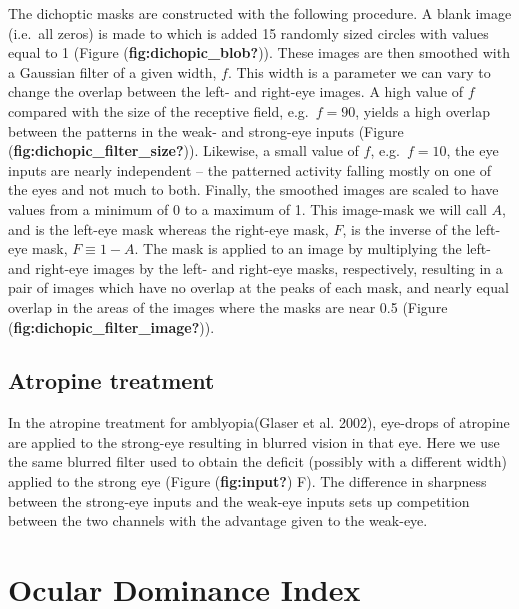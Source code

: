 \documentclass[
  letterpaper,
]{book}
\begin{document}
The dichoptic masks are constructed with the following procedure. A
blank image (i.e.~all zeros) is made to which is added 15 randomly sized
circles with values equal to 1 (Figure (\textbf{fig:dichopic\_blob?})).
These images are then smoothed with a Gaussian filter of a given width,
\(f\). This width is a parameter we can vary to change the overlap
between the left- and right-eye images. A high value of \(f\) compared
with the size of the receptive field, e.g.~\(f=90\), yields a high
overlap between the patterns in the weak- and strong-eye inputs (Figure
(\textbf{fig:dichopic\_filter\_size?})). Likewise, a small value of
\(f\), e.g.~\(f=10\), the eye inputs are nearly independent -- the
patterned activity falling mostly on one of the eyes and not much to
both. Finally, the smoothed images are scaled to have values from a
minimum of 0 to a maximum of 1. This image-mask we will call \(A\), and
is the left-eye mask whereas the right-eye mask, \(F\), is the inverse
of the left-eye mask, \(F\equiv 1-A\). The mask is applied to an image
by multiplying the left- and right-eye images by the left- and right-eye
masks, respectively, resulting in a pair of images which have no overlap
at the peaks of each mask, and nearly equal overlap in the areas of the
images where the masks are near 0.5 (Figure
(\textbf{fig:dichopic\_filter\_image?})).

\hypertarget{atropine-treatment}{%
\section{Atropine treatment}\label{atropine-treatment}}

In the atropine treatment for amblyopia(Glaser et al. 2002), eye-drops
of atropine are applied to the strong-eye resulting in blurred vision in
that eye. Here we use the same blurred filter used to obtain the deficit
(possibly with a different width) applied to the strong eye (Figure
(\textbf{fig:input?}) F). The difference in sharpness between the
strong-eye inputs and the weak-eye inputs sets up competition between
the two channels with the advantage given to the weak-eye.

\hypertarget{ocular-dominance-index}{%
\chapter{Ocular Dominance Index}\label{ocular-dominance-index}}
\end{document}
